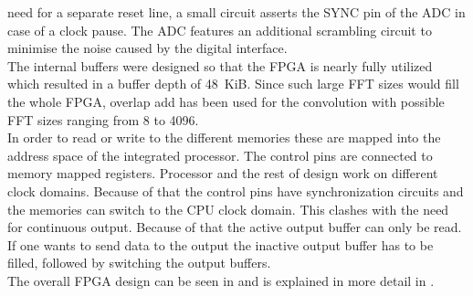\documentclass[11pt,technote,a4paper,twocolumn]{IEEEtran}
\begin{document}
need for a separate reset line, a small circuit asserts the SYNC pin of the
ADC in case of a clock pause. The ADC features an additional scrambling
circuit to minimise the noise caused by the digital interface.\\
The internal buffers were designed so that the FPGA is nearly fully utilized
which resulted in a buffer depth of \SI{48}{KiB}. Since such large FFT sizes
would fill the whole FPGA, overlap add has been used for the convolution with
possible FFT sizes ranging from 8 to 4096.\\
In order to read or write to the different memories these are mapped into the
address space of the integrated processor. The control pins are connected to
memory mapped registers. Processor and the rest of design work on different
clock domains. Because of that the control pins have synchronization circuits
and the memories can switch to the CPU clock domain. This clashes with the
need for continuous output. Because of that the active output buffer can
only be read. If one wants to send data to the output the inactive output
buffer has to be filled, followed by switching the output buffers.\\
The overall FPGA design can be seen in  and is 
explained in more detail in .
\end{document}
